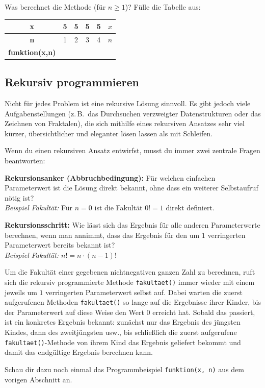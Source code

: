 \noindent Was berechnet die Methode (für $n \ge 1$)? Fülle die Tabelle aus:

\medskip
\begin{tabular}{|c|c|c|c|c|c|}\hline
\textbf{x}             & 5 & 5 & 5 & 5 & $x$ \\ \hline
\textbf{n}             & 1 & 2 & 3 & 4 & $n$ \\ \hline
\textbf{funktion(x,n)} & \hspace{1.2cm} & \hspace{1.2cm} & \hspace{1.2cm} &
\hspace{1.2cm} & \hspace{1.2cm} \\
\hline
\end{tabular}


\subsection{Rekursiv programmieren}

Nicht für jedes Problem ist eine rekursive Lösung sinnvoll. Es gibt jedoch viele
Aufgabenstellungen (z.\,B.\ das Durchsuchen verzweigter Datenstrukturen oder das
Zeichnen von Fraktalen), die sich mithilfe eines rekursiven Ansatzes sehr viel
kürzer, übersichtlicher und eleganter lösen lassen als mit Schleifen.

Wenn du einen rekursiven Ansatz entwirfst, musst du immer zwei zentrale Fragen
beantworten:

\begin{compactenum}[1.]
\item \textbf{Rekursionsanker (Abbruchbedingung):} Für welchen einfachen
Parameterwert ist die Lösung direkt bekannt, ohne dass ein weiterer
Selbstaufruf nötig ist? \\
\emph{Beispiel Fakultät:} Für $n = 0$ ist die Fakultät $0! = 1$ direkt definiert.

\item \textbf{Rekursionsschritt:} Wie lässt sich das Ergebnis für alle anderen
Parameterwerte berechnen, wenn man annimmt, dass das Ergebnis für den um $1$
verringerten Parameterwert bereits bekannt ist? \\
\emph{Beispiel Fakultät:} $n! = n \cdot (n - 1)!$
\end{compactenum}

\medskip
Um die Fakultät einer gegebenen nichtnegativen ganzen Zahl zu berechnen, ruft
sich die rekursiv programmierte Methode \lstinline|fakultaet()| immer wieder
mit einem jeweils um $1$ verringerten Parameterwert selbst auf. Dabei warten
die zuerst aufgerufenen Methoden \lstinline|fakultaet()| so lange auf die
Ergebnisse ihrer \glqq Kinder\grqq , bis der Parameterwert auf diese Weise den
Wert $0$ erreicht hat. Sobald das passiert, ist ein konkretes Ergebnis bekannt:
zunächst nur das Ergebnis des \glqq jüngsten Kindes\grqq , dann des
zweitjüngsten usw., bis schließlich die zuerst aufgerufene
\lstinline|fakultaet()|-Methode von ihrem Kind das Ergebnis geliefert bekommt
und damit das endgültige Ergebnis berechnen kann.

Schau dir dazu noch einmal das Programmbeispiel \lstinline|funktion(x, n)| aus
dem vorigen Abschnitt an.
